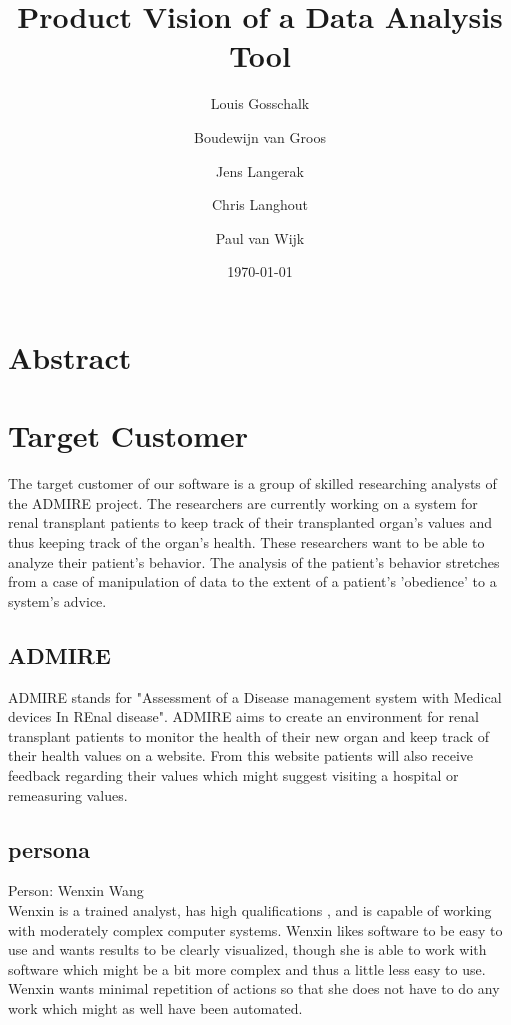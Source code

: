 \documentclass[a4paper]{article}
\title{Product Vision of a Data Analysis Tool}
\author[1]{Louis Gosschalk}
\author[2]{Boudewijn van Groos}
\author[3]{Jens Langerak}
\author[4]{Chris Langhout}
\author[5]{Paul van Wijk}
\affil[1]{lgosschalk \\
4214528}
\affil[2]{bvangroos \\
4229843}
\affil[3]{jlangerak \\
4317327}
\affil[4]{clanghout \\
4281705}
\affil[5]{pvanwijk \\
4285034}
\affil[ ]{Health Informatics Group C}
\date{\today}
\begin{document}
\maketitle

\section*{Abstract}

\newpage

\tableofcontents

\newpage

\section{Target Customer}
The target customer of our software is a group of skilled researching analysts of the ADMIRE project. The researchers are currently working on a system for renal transplant patients to keep track of their transplanted organ's values and thus keeping track of the organ's health. These researchers want to be able to analyze their patient's behavior. The analysis of the patient's behavior stretches from a case of manipulation of data to the extent of a patient's 'obedience' to a system's advice. 

\subsection{ADMIRE}
ADMIRE stands for "Assessment of a Disease management system with Medical devices In REnal disease". ADMIRE aims to create an environment for renal transplant patients to monitor the health of their new organ and keep track of their health values on a website. From this website patients will also receive feedback regarding their values which might suggest visiting a hospital or remeasuring values. \cite{Admire}

\subsection{persona}
Person: Wenxin Wang \\
Wenxin is a trained analyst, has high qualifications \cite{persona}, and is capable of working with moderately complex computer systems. Wenxin likes software to be easy to use and wants results to be clearly visualized, though she is able to work with software which might be a bit more complex and thus a little less easy to use. Wenxin wants minimal repetition of actions so that she does not have to do any work which might as well have been automated.
\end{document}
